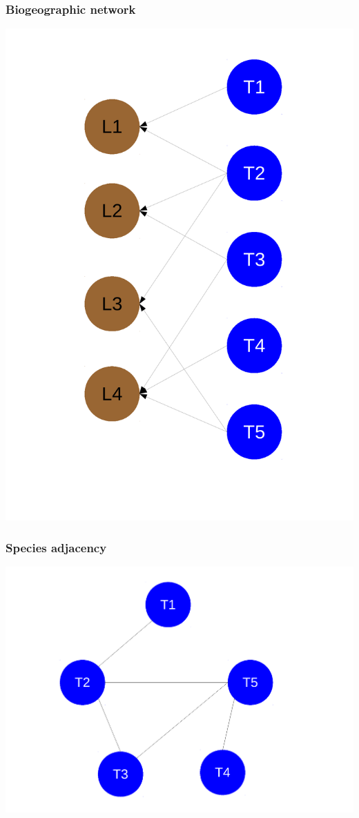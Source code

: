 \documentclass{beamer}
\begin{document}
\begin{frame}
  \frametitle{Biogeographic network}
  \begin{center}
    \includegraphics[height = 0.8\textheight, width = \textwidth,  keepaspectratio = true]{figure/bipartite_graph}
  \end{center}
\end{frame}

\begin{frame}
  \frametitle{Species adjacency}
  \begin{center}
    \includegraphics[height = 0.8\textheight, width = \textwidth,  keepaspectratio = true]{figure/one_mode}
  \end{center}
\end{frame}
\end{document}
